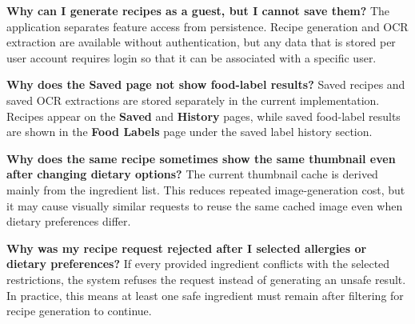 \textbf{Why can I generate recipes as a guest, but I cannot save them?}
The application separates feature access from persistence. Recipe
generation and OCR extraction are available without authentication, but
any data that is stored per user account requires login so that it can
be associated with a specific user.

\textbf{Why does the Saved page not show food-label results?}
Saved recipes and saved OCR extractions are stored separately in the
current implementation. Recipes appear on the \textbf{Saved} and
\textbf{History} pages, while saved food-label results are shown in the
\textbf{Food Labels} page under the saved label history section.

\textbf{Why does the same recipe sometimes show the same thumbnail even
after changing dietary options?}
The current thumbnail cache is derived mainly from the ingredient list.
This reduces repeated image-generation cost, but it may cause visually
similar requests to reuse the same cached image even when dietary
preferences differ.

\textbf{Why was my recipe request rejected after I selected allergies or
dietary preferences?}
If every provided ingredient conflicts with the selected restrictions,
the system refuses the request instead of generating an unsafe result.
In practice, this means at least one safe ingredient must remain after
filtering for recipe generation to continue.
